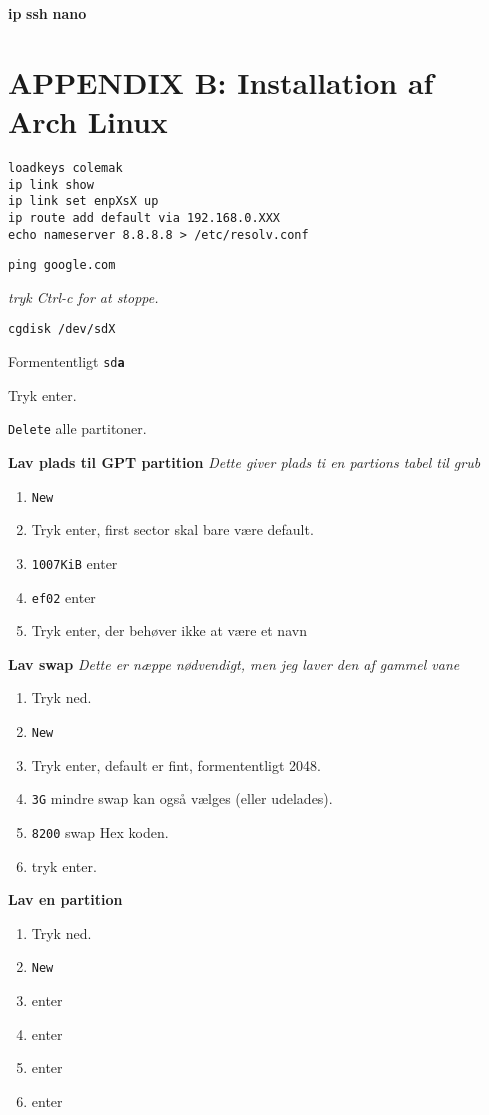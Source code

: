 \documentclass[10pt,a4paper,danish]{article}
\begin{document}
\textbf{ip}
\textbf{ssh}
\textbf{nano}

\section{APPENDIX B: Installation af Arch Linux}
\begin{verbatim}
loadkeys colemak
ip link show
ip link set enpXsX up
ip route add default via 192.168.0.XXX
echo nameserver 8.8.8.8 > /etc/resolv.conf
\end{verbatim}

\begin{verbatim}
ping google.com
\end{verbatim}
\textit{tryk Ctrl-c for at stoppe.}

\begin{verbatim}
cgdisk /dev/sdX
\end{verbatim}

Formententligt \texttt{sd\textbf{a}}

Tryk enter.

\texttt{Delete} alle partitoner.

\textbf{Lav plads til GPT partition}
\textit{Dette giver plads ti en partions tabel til grub}\
\begin{enumerate}
\item \texttt{New}
\item Tryk enter, first sector skal bare  være default.
\item \texttt{1007KiB} enter
\item \texttt{ef02} enter
\item Tryk enter, der behøver ikke at være et navn
\end{enumerate}

\textbf{Lav swap}
\textit{Dette er næppe nødvendigt, men jeg laver den af gammel vane}
\begin{enumerate}
\item Tryk ned.
\item \texttt{New}
\item Tryk enter, default er fint, formententligt 2048.
\item \texttt{3G} mindre swap kan også vælges (eller udelades).
\item \texttt{8200} swap Hex koden.
\item tryk enter.
\end{enumerate}

\textbf{Lav en partition}
\begin{enumerate}
\item Tryk ned.
\item \texttt{New}
\item enter
\item enter
\item enter
\item enter
\end{enumerate}
\end{document}
